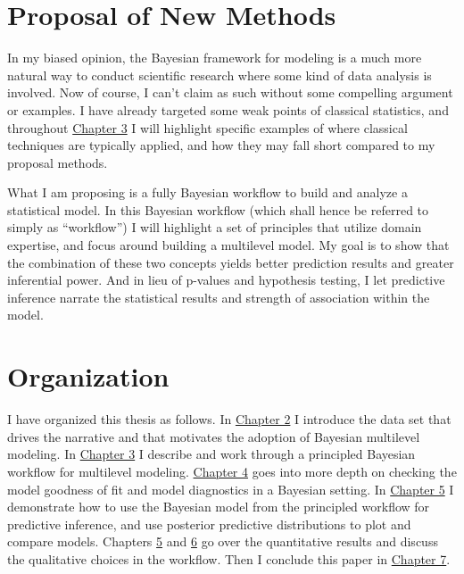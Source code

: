 \documentclass[11pt, oneside, openany]{scrbook}
\begin{document}
\hypertarget{ch010-new-methods}{%
\section{Proposal of New Methods}\label{ch010-new-methods}}

In my biased opinion, the Bayesian framework for modeling is a much more natural way to conduct scientific research where some kind of data analysis is involved. Now of course, I can't claim as such without some compelling argument or examples. I have already targeted some weak points of classical statistics, and throughout \protect\hyperlink{workflow}{Chapter 3} I will highlight specific examples of where classical techniques are typically applied, and how they may fall short compared to my proposal methods.

What I am proposing is a fully Bayesian workflow to build and analyze a statistical model. In this Bayesian workflow (which shall hence be referred to simply as ``workflow'') I will highlight a set of principles that utilize domain expertise, and focus around building a multilevel model. My goal is to show that the combination of these two concepts yields better prediction results and greater inferential power. And in lieu of p-values and hypothesis testing, I let predictive inference narrate the statistical results and strength of association within the model.

\hypertarget{ch010-organization}{%
\section{Organization}\label{ch010-organization}}

I have organized this thesis as follows. In \protect\hyperlink{motivating-data}{Chapter 2} I introduce the data set that drives the narrative and that motivates the adoption of Bayesian multilevel modeling. In \protect\hyperlink{workflow}{Chapter 3} I describe and work through a principled Bayesian workflow for multilevel modeling. \protect\hyperlink{model-checking}{Chapter 4} goes into more depth on checking the model goodness of fit and model diagnostics in a Bayesian setting. In \protect\hyperlink{predictive-inference}{Chapter 5} I demonstrate how to use the Bayesian model from the principled workflow for predictive inference, and use posterior predictive distributions to plot and compare models. Chapters \protect\hyperlink{}{5} and \protect\hyperlink{}{6} go over the quantitative results and discuss the qualitative choices in the workflow. Then I conclude this paper in \protect\hyperlink{conclusion}{Chapter 7}.
\end{document}
